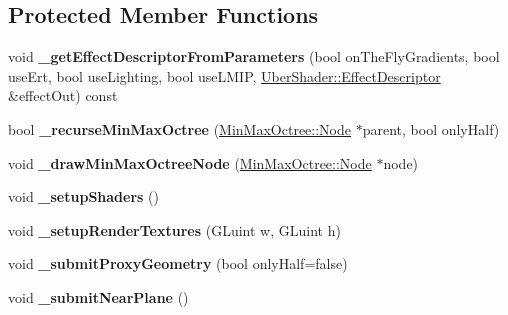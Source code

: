 \subsection*{\-Protected \-Member \-Functions}
\begin{DoxyCompactItemize}
\item 
\hypertarget{class_verdi_1_1_ray_cast_strategy_afd72128411130b55e9b8ae0b43a2a3dc}{void {\bfseries \-\_\-get\-Effect\-Descriptor\-From\-Parameters} (bool on\-The\-Fly\-Gradients, bool use\-Ert, bool use\-Lighting, bool use\-L\-M\-I\-P, \hyperlink{struct_verdi_1_1_uber_shader_1_1_effect_descriptor}{\-Uber\-Shader\-::\-Effect\-Descriptor} \&effect\-Out) const }\label{class_verdi_1_1_ray_cast_strategy_afd72128411130b55e9b8ae0b43a2a3dc}

\item 
\hypertarget{class_verdi_1_1_ray_cast_strategy_a3309edbb01a2fd9cd9f268566e29abfa}{bool {\bfseries \-\_\-recurse\-Min\-Max\-Octree} (\hyperlink{class_verdi_1_1_min_max_octree_1_1_node}{\-Min\-Max\-Octree\-::\-Node} $\ast$parent, bool only\-Half)}\label{class_verdi_1_1_ray_cast_strategy_a3309edbb01a2fd9cd9f268566e29abfa}

\item 
\hypertarget{class_verdi_1_1_ray_cast_strategy_a1b1c3936ae2c796786f1680a81964244}{void {\bfseries \-\_\-draw\-Min\-Max\-Octree\-Node} (\hyperlink{class_verdi_1_1_min_max_octree_1_1_node}{\-Min\-Max\-Octree\-::\-Node} $\ast$node)}\label{class_verdi_1_1_ray_cast_strategy_a1b1c3936ae2c796786f1680a81964244}

\item 
\hypertarget{class_verdi_1_1_ray_cast_strategy_acde8a0db750a6f84173a7ba2a99f4cea}{void {\bfseries \-\_\-setup\-Shaders} ()}\label{class_verdi_1_1_ray_cast_strategy_acde8a0db750a6f84173a7ba2a99f4cea}

\item 
\hypertarget{class_verdi_1_1_ray_cast_strategy_a8eadd3e2a76686ccb8d30e8865140674}{void {\bfseries \-\_\-setup\-Render\-Textures} (\-G\-Luint w, \-G\-Luint h)}\label{class_verdi_1_1_ray_cast_strategy_a8eadd3e2a76686ccb8d30e8865140674}

\item 
\hypertarget{class_verdi_1_1_ray_cast_strategy_a073c5ae78e02a7d01d48008edc2eec24}{void {\bfseries \-\_\-submit\-Proxy\-Geometry} (bool only\-Half=false)}\label{class_verdi_1_1_ray_cast_strategy_a073c5ae78e02a7d01d48008edc2eec24}

\item 
\hypertarget{class_verdi_1_1_ray_cast_strategy_a527ca0cd120fecbfd5f5289fbc3bfc44}{void {\bfseries \-\_\-submit\-Near\-Plane} ()}\label{class_verdi_1_1_ray_cast_strategy_a527ca0cd120fecbfd5f5289fbc3bfc44}


\end{DoxyCompactItemize}
